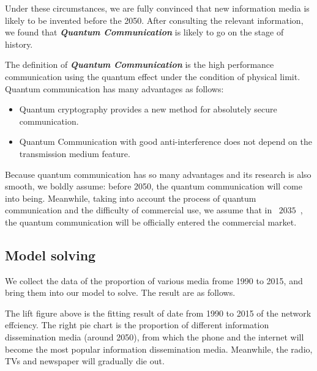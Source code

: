 \documentclass[a4paper,11pt]{article}
\begin{document}
\par Under these circumstances, we are fully convinced that new information media is likely to be invented before the 2050. After consulting the relevant information\cite{RH}, we found that \textbf{\emph{Quantum Communication}} is likely to go on the stage of history. 

\par The definition of \textbf{\emph{Quantum Communication}} is the high performance communication using the quantum effect under the condition of physical limit. Quantum communication has many advantages as follows:

\begin{itemize}
\item Quantum cryptography provides a new method for absolutely secure communication.
\item Quantum Communication with good anti-interference does not depend on the transmission medium feature.
\end{itemize}
\par Because quantum communication has so many advantages and its research is also smooth, we boldly assume: before 2050, the quantum communication will come into being. Meanwhile, taking into account the process of quantum communication and the difficulty of commercial use, we assume that in ~$2035$~, the quantum communication will be officially entered the commercial market.




\subsection{Model solving}
\par We collect the data of the proportion of various media frome 1990 to 2015, and bring them into our model to solve. The result are as follows.

\par The lift figure above is the fitting result of date from 1990 to 2015\cite{RK} of the network effciency. The right  pie chart is the proportion of different information dissemination media (around 2050), from which the phone and the internet will become the most popular information dissemination media. Meanwhile, the radio, TVs and newspaper will gradually die out.
\end{document}
